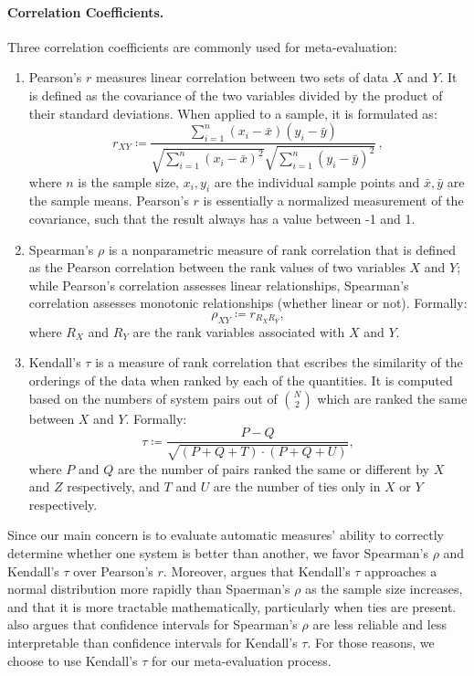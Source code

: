 \paragraph{Correlation Coefficients.}
Three correlation coefficients are commonly used for meta-evaluation:
\begin{enumerate}
    \item Pearson's $r$ \citep{pearson1895vii} measures linear correlation between two sets of data $X$ and $Y$. It is defined as the covariance of the two variables divided by the product of their standard deviations. When applied to a sample, it is formulated as:
    \[ r_{XY} \coloneqq \frac{\sum_{i=1}^n (x_i - \bar{x}) (y_i - \bar{y})}{\sqrt{\sum_{i=1}^n (x_i - \bar{x})^2}\sqrt{\sum_{i=1}^n (y_i - \bar{y})^2}} \, ,\]
    where $n$ is the sample size, $x_i, y_i$ are the individual sample points and $\bar{x}, \bar{y}$ are the sample means. Pearson's $r$ is essentially a normalized measurement of the covariance, such that the result always has a value between -1 and 1.
    \item Spearman's $\rho$ \citep{spearman1904proof} is a nonparametric measure of rank correlation that is defined as the Pearson correlation between the rank values of two variables $X$ and $Y$; while Pearson's correlation assesses linear relationships, Spearman's correlation assesses monotonic relationships (whether linear or not). Formally: \[ \rho_{XY} \coloneqq r_{R_X R_Y} , \] where $R_X$ and $R_Y$ are the rank variables associated with $X$ and $Y$.
    \item Kendall's $\tau$ \citep{kendall1938new} is a measure of rank correlation that escribes the similarity of the orderings of the data when ranked by each of the quantities. It is computed based on the numbers of system pairs out of $\binom{N}{2}$ which are ranked the same between $X$ and $Y$. Formally:
    \[ \tau \coloneqq \frac{P - Q}{\sqrt{(P + Q + T) \cdot (P + Q + U)}}, \]
    where $P$ and $Q$ are the number of pairs ranked the same or different by $X$ and $Z$ respectively, and $T$ and $U$ are the number of ties only in $X$ or $Y$ respectively.
\end{enumerate}

Since our main concern is to evaluate automatic measures' ability to correctly determine whether one system is better than another, we favor Spearman's $\rho$ and Kendall's $\tau$ over Pearson's $r$. Moreover, \citet{gilpin1993table} argues that Kendall's $\tau$ approaches a normal distribution more rapidly than Spaerman's $\rho$ as the sample size increases, and that it is more tractable mathematically, particularly when ties are present. \citet{newson2002parameters} also argues that confidence intervals for Spearman's $\rho$ are less reliable and less interpretable than confidence intervals for Kendall's $\tau$. For those reasons, we choose to use Kendall's $\tau$ for our meta-evaluation process.

